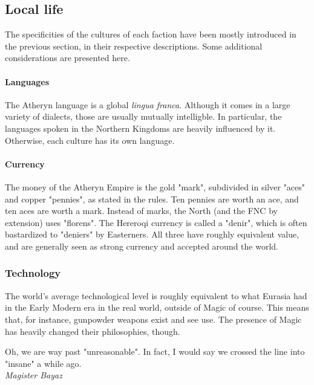 
\subsection{Local life}

The specificities of the cultures of each faction have been mostly introduced in the previous section, in their respective descriptions. Some additional considerations are presented here.

\paragraph{Languages}

The Atheryn language is a global \textit{lingua franca}. Although it comes in a large variety of dialects, those are usually mutually intelligble. In particular, the languages spoken in the Northern Kingdoms are heavily influenced by it. Otherwise, each culture has its own language.

\paragraph{Currency}

The money of the Atheryn Empire is the gold "mark", subdivided in silver "aces" and copper "pennies", as stated in the rules. Ten pennies are worth an ace, and ten aces are worth a mark. Instead of marks, the North (and the FNC by extension) uses "florens". The Hereroqi currency is called a "denir", which is often bastardized to "deniers" by Easterners. All three have roughly equivalent value, and are generally seen as strong currency and accepted around the world.


\subsubsection{Technology}

The world's average technological level is roughly equivalent to what Eurasia had in the Early Modern era in the real world, outside of Magic of course. This means that, for instance, gunpowder weapons exist and see use. The presence of Magic has heavily changed their philosophies, though.

\begin{rpg-quotebox}
    Oh, we are way past "unreasonable". In fact, I would say we crossed the line into "insane" a while ago. \\ \textendash \textit{Magister Bayaz}
\end{rpg-quotebox}

